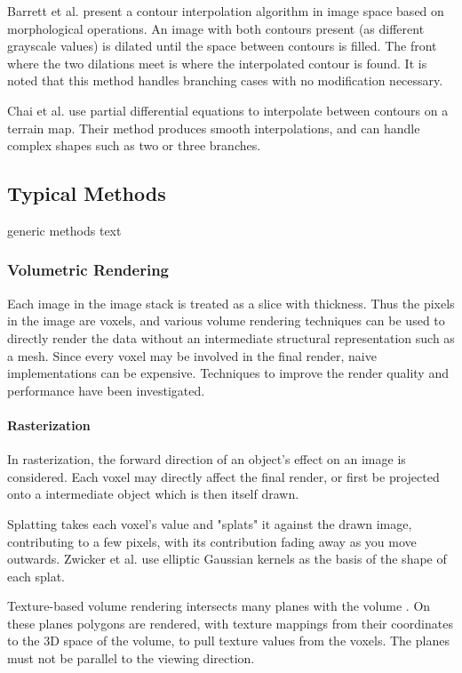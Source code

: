 \documentclass[11p, titlepage]{article}
\begin{document}
Barrett et al. \cite{barrett1994image} present a contour interpolation algorithm in image space based on morphological operations. An image with both contours present (as different grayscale values) is dilated until the space between contours is filled. The front where the two dilations meet is where the interpolated contour is found. It is noted that this method handles branching cases with no modification necessary.

Chai et al. \cite{chai1998contour} use partial differential equations to interpolate between contours on a terrain map. Their method produces smooth interpolations, and can handle complex shapes such as two or three branches.

\subsection{Typical Methods}

generic methods text

\subsubsection{Volumetric Rendering}

Each image in the image stack is treated as a slice with thickness. Thus the pixels in the image are voxels, and various volume rendering techniques can be used to directly render the data without an intermediate structural representation such as a mesh. Since every voxel may be involved in the final render, naive implementations can be expensive. Techniques to improve the render quality and performance have been investigated.

\paragraph{Rasterization}

In rasterization, the forward direction of an object's effect on an image is considered. Each voxel may directly affect the final render, or first be projected onto a intermediate object which is then itself drawn.

Splatting takes each voxel's value and "splats" it against the drawn image, contributing to a few pixels, with its contribution fading away as you move outwards. Zwicker et al. \cite{zwicker2002ewa} use elliptic Gaussian kernels as the basis of the shape of each splat.

Texture-based volume rendering intersects many planes with the volume \cite{ohiotexture}. On these planes polygons are rendered, with texture mappings from their coordinates to the 3D space of the volume, to pull texture values from the voxels. The planes must not be parallel to the viewing direction.
\end{document}
